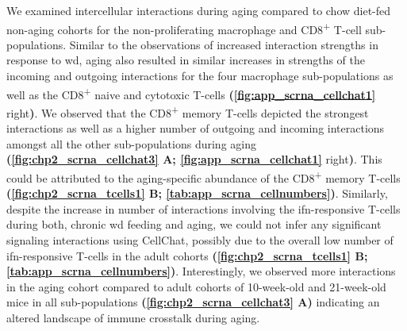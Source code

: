\par  We examined intercellular interactions during aging compared to chow diet-fed non-aging cohorts for the non-proliferating macrophage and CD8\textsuperscript{+} T-cell sub-populations. Similar to the observations of increased interaction strengths in response to \gls{wd}, aging also resulted in similar increases in strengths of the incoming and outgoing interactions for the four macrophage sub-populations as well as the CD8\textsuperscript{+} naive and cytotoxic T-cells \textbf{(\autoref{fig:app_scrna_cellchat1}} right\textbf{)}. We observed that the CD8\textsuperscript{+} memory T-cells depicted the strongest interactions as well as a higher number of outgoing and incoming interactions amongst all the other sub-populations during aging \textbf{(\autoref{fig:chp2_scrna_cellchat3} A; \autoref{fig:app_scrna_cellchat1}} right\textbf{)}. This could be attributed to the aging-specific abundance of the CD8\textsuperscript{+} memory T-cells \textbf{(\autoref{fig:chp2_scrna_tcells1} B; \autoref{tab:app_scrna_cellnumbers})}. Similarly, despite the increase in number of interactions involving the \gls{ifn}-responsive T-cells during both, chronic \gls{wd} feeding and aging, we could not infer any significant signaling interactions using CellChat, possibly due to the overall low number of \gls{ifn}-responsive T-cells in the adult cohorts \textbf{(\autoref{fig:chp2_scrna_tcells1} B; \autoref{tab:app_scrna_cellnumbers})}. Interestingly, we observed more interactions in the aging cohort compared to adult cohorts of 10-week-old and 21-week-old mice in all sub-populations \textbf{(\autoref{fig:chp2_scrna_cellchat3} A)} indicating an altered landscape of immune crosstalk during aging.\\

